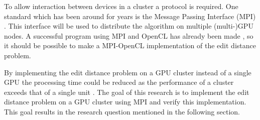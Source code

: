 To allow interaction between devices in a cluster a protocol is required.
One standard which has been around for years is the Message Passing Interface (MPI) \cite{MPI}.
This interface will be used to distribute the algorithm on multiple (multi-)GPU nodes.
A successful program using MPI and OpenCL has already been made \cite{Cluster}, so it should be possible to make a MPI-OpenCL implementation of the edit distance problem.

By implementing the edit distance problem on a GPU cluster instead of a single GPU the processing time could be reduced as the performance of a cluster exceeds that of a single unit \cite{Cluster}.
The goal of this research is to implement the edit distance problem on a GPU cluster using MPI and verify this implementation.
This goal results in the research question mentioned in the following section.

